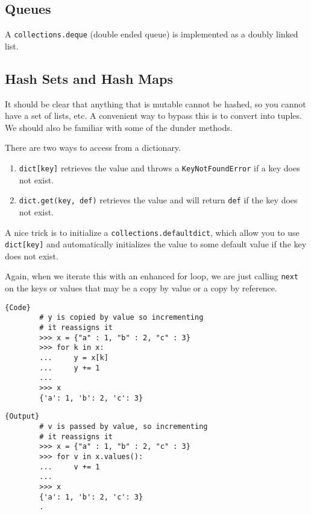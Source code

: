\documentclass{article}
\begin{document}
  \subsection{Queues} 

    A \texttt{collections.deque} (double ended queue) is implemented as a doubly linked list. 

  \subsection{Hash Sets and Hash Maps} 

    It should be clear that anything that is mutable cannot be hashed, so you cannot have a set of lists, etc. A convenient way to bypass this is to convert into tuples. We should also be familiar with some of the dunder methods. 

    \begin{definition}[Get]
      There are two ways to access from a dictionary. 
      \begin{enumerate}
        \item \texttt{dict[key]} retrieves the value and throws a \texttt{KeyNotFoundError} if a key does not exist. 
        \item \texttt{dict.get(key, def)} retrieves the value and will return \texttt{def} if the key does not exist. 
      \end{enumerate}
    \end{definition}

    A nice trick is to initialize a \texttt{collections.defaultdict}, which allow you to use \texttt{dict[key]} and automatically initializes the value to some default value if the key does not exist. 

    \begin{example}
      Again, when we iterate this with an enhanced for loop, we are just calling \texttt{next} on the keys or values that may be a copy by value or a copy by reference. 

      \noindent\begin{minipage}{.5\textwidth}
      \begin{lstlisting}[]{Code}
        # y is copied by value so incrementing 
        # it reassigns it
        >>> x = {"a" : 1, "b" : 2, "c" : 3}
        >>> for k in x: 
        ...     y = x[k]
        ...     y += 1
        ... 
        >>> x
        {'a': 1, 'b': 2, 'c': 3} 
      \end{lstlisting}
      \end{minipage}
      \hfill
      \begin{minipage}{.49\textwidth}
      \begin{lstlisting}[]{Output}
        # v is passed by value, so incrementing 
        # it reassigns it 
        >>> x = {"a" : 1, "b" : 2, "c" : 3}
        >>> for v in x.values(): 
        ...     v += 1
        ... 
        >>> x
        {'a': 1, 'b': 2, 'c': 3} 
        .
      \end{lstlisting}
      \end{minipage}
    \end{example}
\end{document}
